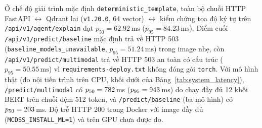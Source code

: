 Ở chế độ giải trình mặc định \texttt{deterministic\_template}, toàn bộ chuỗi HTTP FastAPI $\leftrightarrow$ Qdrant lai (\texttt{v1.20.0}, 64 vector) $\leftrightarrow$ kiểm chứng tọa độ ký tự trên \texttt{/api/v1/agent/explain} đạt $p_{50} = 62.92\,\text{ms}$ ($p_{95} = 84.23\,\text{ms}$). Điểm cuối \texttt{/api/v1/predict/baseline} mặc định trả về HTTP 503 (\texttt{baseline\_models\_unavailable}, $p_{95} = 51.24\,\text{ms}$) trong image nhẹ, còn \texttt{/api/v1/predict/multimodal} trả về HTTP 503 an toàn có cấu trúc ($p_{95} = 50.55\,\text{ms}$) vì \texttt{requirements-deploy.txt} không đóng gói \texttt{torch}. Với mô hình thật (đo nội tiến trình trên CPU, khối dưới của Bảng~\ref{tab:system_latency}), \texttt{/predict/multimodal} có $p_{50}=782$\,ms ($p_{95}=943$\,ms) do chạy đầy đủ 12 khối BERT trên chuỗi đệm 512 token, và \texttt{/predict/baseline} (ba mô hình) có $p_{50}=203$\,ms. Độ trễ HTTP 200 trong Docker với image đầy đủ (\texttt{MCDSS\_INSTALL\_ML=1}) và trên GPU chưa được đo.
